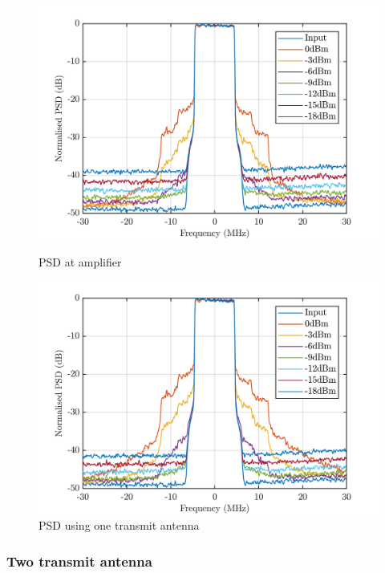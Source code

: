 \begin{figure}[H]
  \centering
  \begin{minipage}[b]{0.5\textwidth}
	\includegraphics[scale = 0.5]{figures/measurement/two_antenna/amplifier_psd.png}
	\caption{PSD at amplifier}
    \label{fig:psd_amp}
  \end{minipage}
  \hfill
  \begin{minipage}[b]{0.4\textwidth}
\includegraphics[scale = 0.5]{figures/measurement/two_antenna/one_ant_psd.png}
\caption{PSD using one transmit antenna}
    \label{fig:psd_one_ant}
  \end{minipage}
\end{figure}

\subsubsection{Two transmit antenna}

